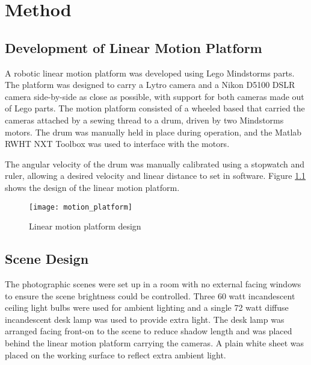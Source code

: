 
\chapter{Method}


\section{Development of Linear Motion Platform}

A robotic linear motion platform was developed using Lego\textsuperscript{\textregistered} Mindstorms\textsuperscript{\textregistered} parts.
The platform was designed to carry a Lytro camera and a Nikon D5100 DSLR camera side-by-side as close as possible, with support for both cameras made out of Lego parts.
The motion platform consisted of a wheeled based that carried the cameras attached by a sewing thread to a drum, driven by two Mindstorms motors.
The drum was manually held in place during operation, and the Matlab RWHT NXT Toolbox \cite{rwth07toolbox} was used to interface with the motors.

The angular velocity of the drum was manually calibrated using a stopwatch and ruler, allowing a desired velocity and linear distance to set in software.
Figure \ref{fig:motion_platform} shows the design of the linear motion platform.

\begin{figure}[h]

\centering

\texttt{[image: motion\_platform]}

\caption{Linear motion platform design}
\label{fig:motion_platform}

\end{figure}


\section{Scene Design}

The photographic scenes were set up in a room with no external facing windows to ensure the scene brightness could be controlled.
Three 60 watt incandescent ceiling light bulbs were used for ambient lighting and a single 72 watt diffuse incandescent desk lamp was used to provide extra light.
The desk lamp was arranged facing front-on to the scene to reduce shadow length and was placed behind the linear motion platform carrying the cameras.
A plain white sheet was placed on the working surface to reflect extra ambient light.

